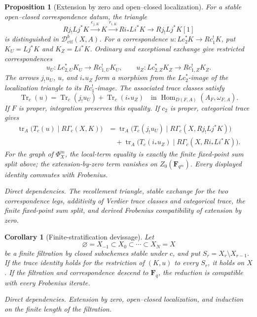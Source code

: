 \documentclass[10pt]{article}
\newtheorem{proposition}[theorem]{Proposition}
\newtheorem{corollary}[theorem]{Corollary}
\theoremstyle{definition}
\newcommand{\Fq}{\mathbf F_q}
\newcommand{\Dctf}{\mathcal D^b_{\mathrm{ctf}}}
\newcommand{\Hom}{\operatorname{Hom}}
\newcommand{\RGammac}{R\Gamma_c}
\newcommand{\depends}[1]{\par\smallskip\noindent\textit{Direct dependencies.} #1\par}
\begin{document}
\begin{proposition}[Extension by zero and open--closed localization]
For a stable open--closed correspondence datum, the triangle
\[
 Rj_!Lj^*K\xrightarrow{e_{j,K}}K
 \xrightarrow{r_{i,K}}Ri_*Li^*K
 \longrightarrow Rj_!Lj^*K[1]
\]
is distinguished in \(\Dctf(X,A)\).  For a correspondence
\(u:Lc_2^*K\to Rc_1^!K\), put \(K_U=Lj^*K\) and \(K_Z=Li^*K\).
Ordinary and exceptional exchange give restricted correspondences
\[
 u_U:Lc_{2,U}^*K_U\longrightarrow Rc_{1,U}^!K_U,
 \qquad
 u_Z:Lc_{2,Z}^*K_Z\longrightarrow Rc_{1,Z}^!K_Z.
\]
The arrows \(j_!u_U\), \(u\), and \(i_*u_Z\) form a morphism from the
\(Lc_2^*\)-image of the localization triangle to its \(Rc_1^!\)-image.
The associated trace classes satisfy
\[
 \operatorname{Tr}_c(u)=
 \operatorname{Tr}_c(j_!u_U)+\operatorname{Tr}_c(i_*u_Z)
 \quad\text{in }
 \Hom_{D(F,A)}(A_F,\omega_{F,A}).
\]
If \(F\) is proper, integration preserves this equality.  If \(c_2\) is
proper, categorical trace gives
\[
\begin{aligned}
 \operatorname{tr}_A\bigl(T_c(u)\mid\RGammac(X,K)\bigr)
 &=\operatorname{tr}_A\bigl(T_c(j_!u_U)\mid
       \RGammac(X,Rj_!Lj^*K)\bigr)\\
 &\quad+\operatorname{tr}_A\bigl(T_c(i_*u_Z)\mid
       \RGammac(X,Ri_*Li^*K)\bigr).
\end{aligned}
\]
For the graph of \(\Phi_X^m\), the local-term equality is exactly the
finite fixed-point sum split above; the extension-by-zero term vanishes on
\(Z_0(\mathbf F_{q^m})\).  Every displayed identity commutes with
Frobenius.
\depends{The recollement triangle, stable exchange for the two
correspondence legs, additivity of Verdier trace classes and categorical
trace, the finite fixed-point sum split, and derived Frobenius
compatibility of extension by zero.}
\end{proposition}

\begin{corollary}[Finite-stratification devissage]
Let
\[
 \varnothing=X_{-1}\subset X_0\subset\cdots\subset X_N=X
\]
be a finite filtration by closed subschemes stable under \(c\), and put
\(S_r=X_r\setminus X_{r-1}\).  If the trace identity holds for the
restriction of \((K,u)\) to every \(S_r\), it holds on \(X\).  If the
filtration and correspondence descend to \(\Fq\), the reduction is
compatible with every Frobenius iterate.
\depends{Extension by zero, open--closed localization, and induction on
the finite length of the filtration.}
\end{corollary}
\end{document}
